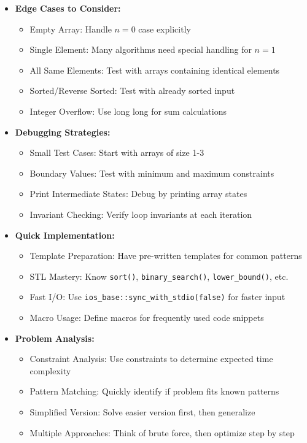 \documentclass[a4paper,10pt]{book}
\begin{document}
\begin{itemize}[leftmargin=*]
    \item \textbf{Edge Cases to Consider:}
    \begin{itemize}
        \item Empty Array: Handle $n = 0$ case explicitly
        \item Single Element: Many algorithms need special handling for $n = 1$
        \item All Same Elements: Test with arrays containing identical elements
        \item Sorted/Reverse Sorted: Test with already sorted input
        \item Integer Overflow: Use long long for sum calculations
    \end{itemize}

    \item \textbf{Debugging Strategies:}
    \begin{itemize}
        \item Small Test Cases: Start with arrays of size 1-3
        \item Boundary Values: Test with minimum and maximum constraints
        \item Print Intermediate States: Debug by printing array states
        \item Invariant Checking: Verify loop invariants at each iteration
    \end{itemize}
\end{itemize}
\begin{itemize}[leftmargin=*]
    \item \textbf{Quick Implementation:}
    \begin{itemize}
        \item Template Preparation: Have pre-written templates for common patterns
        \item STL Mastery: Know \texttt{sort()}, \texttt{binary\_search()}, \texttt{lower\_bound()}, etc.
        \item Fast I/O: Use \texttt{ios\_base::sync\_with\_stdio(false)} for faster input
        \item Macro Usage: Define macros for frequently used code snippets
    \end{itemize}

    \item \textbf{Problem Analysis:}
    \begin{itemize}
        \item Constraint Analysis: Use constraints to determine expected time complexity
        \item Pattern Matching: Quickly identify if problem fits known patterns
        \item Simplified Version: Solve easier version first, then generalize
        \item Multiple Approaches: Think of brute force, then optimize step by step
    \end{itemize}
\end{itemize}
\end{document}
